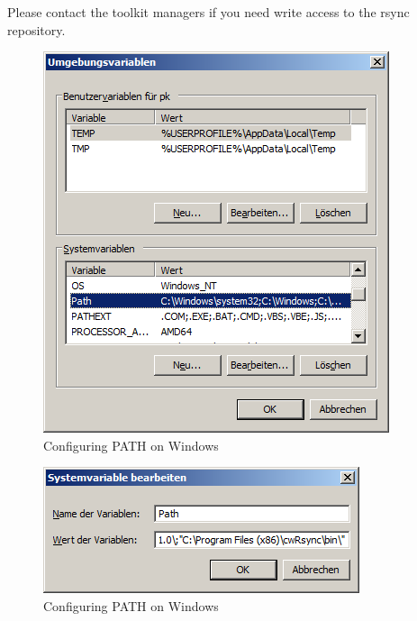 \documentclass[a4paper,twoside]{book}      %
\begin{document}
Please contact the toolkit managers if you need write access to the rsync repository.


\begin{figure}
\centering
\includegraphics[scale=0.8]{img/WindowsPath1.png}
\caption{Configuring PATH on Windows}
\label{fig:rSyncWindowsPath1}
\end{figure}

\begin{figure}
\centering
\includegraphics[scale=0.8]{img/WindowsPath2.png}
\caption{Configuring PATH on Windows}
\label{fig:rSyncWindowsPath2}
\end{figure}
\end{document}
